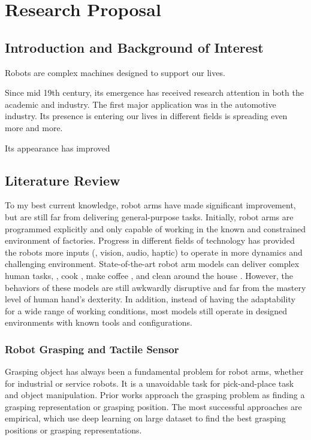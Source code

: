 \chapter{Research Proposal}

\section{Introduction and Background of Interest}
Robots are complex machines designed to support our lives.

Since mid 19th century, its emergence has received research attention in both the academic and industry. The first major application was in the automotive industry. Its presence is entering our lives in different fields is spreading even more and more.

Its appearance has improved 

\section{Literature Review}

To my best current knowledge, robot arms have made significant improvement, but are still far from delivering general-purpose tasks. Initially, robot arms are programmed explicitly and only capable of working in the known and constrained environment of factories. Progress in different fields of technology has provided the robots more inputs (\eg, vision, audio, haptic) to operate in more dynamics and challenging environment. State-of-the-art robot arm models can deliver complex human tasks, \eg, cook \cite{moley}, make coffee \cite{coffeemaster}, and clean around the house \cite{bothandy}. However, the behaviors of these models are still awkwardly disruptive and far from the mastery level of human hand's dexterity. In addition, instead of having the adaptability for a wide range of working conditions, most models still operate in designed environments with known tools and configurations.

\subsection{Robot Grasping and Tactile Sensor}

Grasping object has always been a fundamental problem for robot arms, whether for industrial or service robots. It is a unavoidable task for pick-and-place task and object manipulation. Prior works approach the grasping problem as finding a grasping representation or grasping position. The most successful approaches are empirical, which use deep learning on large dataset to find the best grasping positions or grasping representations. 
\cite{caldera2018review}

